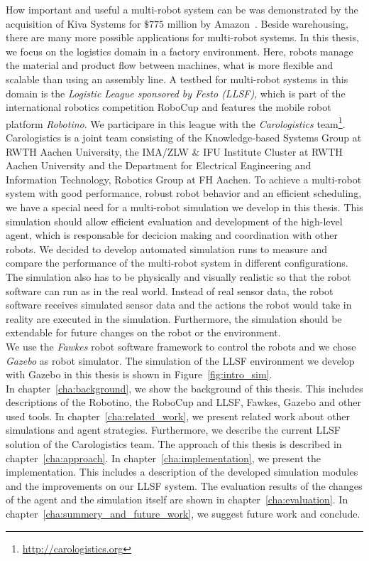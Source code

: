 How important and useful a multi-robot system can be was demonstrated by the acquisition of Kiva Systems for $\$775$ million by Amazon~\cite{kiva_amazon}. Beside warehousing, there are many more possible applications for multi-robot systems. In this thesis, we focus on the logistics domain in a factory environment. Here, robots manage the material and product flow between machines, what is more flexible and scalable than using an assembly line. A testbed for multi-robot systems in this domain is the \textit{Logistic League sponsored by Festo (LLSF)}, which is part of the international robotics competition RoboCup and features the mobile robot platform \textit{Robotino}. We participare in this league with the \textit{Carologistics} team\footnote{\url{http://carologistics.org}}. Carologistics is a joint team consisting of the Knowledge-based Systems Group at RWTH Aachen University, the IMA/ZLW \& IFU Institute Cluster at RWTH Aachen University and the Department for Electrical Engineering and Information Technology, Robotics Group at FH Aachen. To achieve a multi-robot system with good performance, robust robot behavior and an efficient scheduling, we have a special need for a multi-robot simulation we develop in this thesis. This simulation should allow efficient evaluation and development of the high-level agent, which is responsable for decicion making and coordination with other robots. We decided to develop automated simulation runs to measure and compare the performance of the multi-robot system in different configurations. The simulation also has to be physically and visually realistic so that the robot software can run as in the real world. Instead of real sensor data, the robot software receives simulated sensor data and the actions the robot would take in reality are executed in the simulation. Furthermore, the simulation should be extendable for future changes on the robot or the environment.\\
We use the \textit{Fawkes} robot software framework to control the robots and we chose \textit{Gazebo} as robot simulator. The simulation of the LLSF environment we develop with Gazebo in this thesis is shown in Figure~\ref{fig:intro_sim}.\\
In chapter~\ref{cha:background}, we show the background of this thesis. This includes descriptions of the Robotino, the RoboCup and LLSF, Fawkes, Gazebo and other used tools. In chapter~\ref{cha:related_work}, we present related work about other simulations and agent strategies. Furthermore, we describe the current LLSF solution of the Carologistics team. The approach of this thesis is described in chapter~\ref{cha:approach}. In chapter~\ref{cha:implementation}, we present the implementation. This includes a description of the developed simulation modules and the improvements on our LLSF system. The evaluation results of the changes of the agent and the simulation itself are shown in chapter~\ref{cha:evaluation}. In chapter~\ref{cha:summery_and_future_work}, we suggest future work and conclude.



